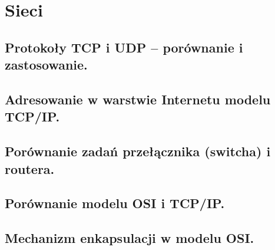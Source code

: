 \chapter{Sieci}
\section{Protokoły TCP i UDP – porównanie i zastosowanie.}
\section{Adresowanie w warstwie Internetu modelu TCP/IP. }
\section{Porównanie zadań przełącznika (switcha) i routera.}
\section{Porównanie modelu OSI i TCP/IP.}
\section{Mechanizm enkapsulacji w modelu OSI.}